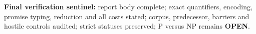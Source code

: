 \documentclass[11pt]{article}
\newcommand{\OPEN}{\textbf{OPEN}}
\begin{document}
\noindent\textbf{Final verification sentinel:} report body complete; exact
quantifiers, encoding, promise typing, reduction and all costs stated; corpus,
predecessor, barriers and hostile controls audited; strict statuses preserved;
P versus NP remains \OPEN.
\end{document}
